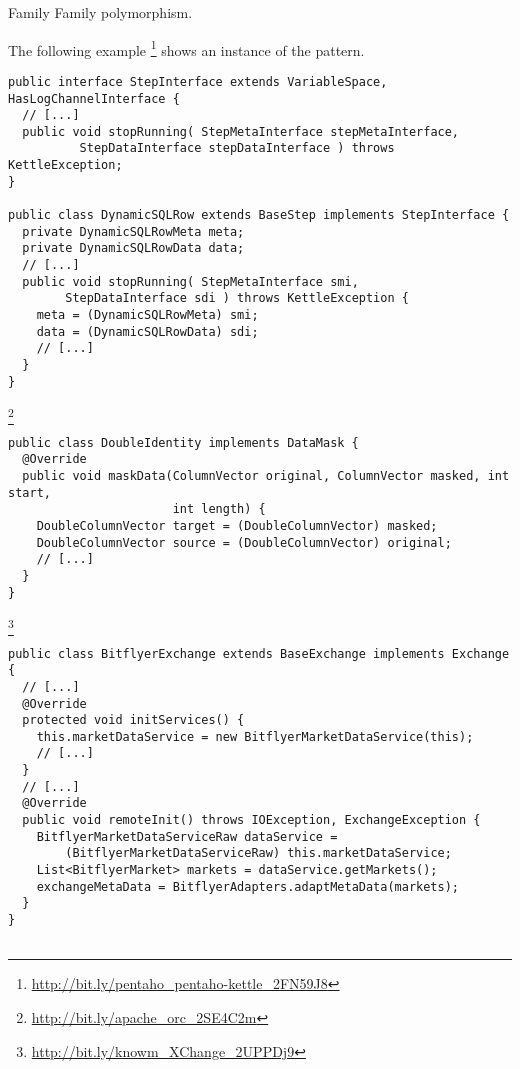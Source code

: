 \begin{pattern}{Family}
Family polymorphism.

\instances{}
The following example%
\footnote{\url{http://bit.ly/pentaho_pentaho-kettle_2FN59J8}}
%
%
shows an instance of the \thisp{} pattern.

\begin{verbatim}
public interface StepInterface extends VariableSpace, HasLogChannelInterface {
  // [...]
  public void stopRunning( StepMetaInterface stepMetaInterface,
          StepDataInterface stepDataInterface ) throws KettleException;
}

public class DynamicSQLRow extends BaseStep implements StepInterface {
  private DynamicSQLRowMeta meta;
  private DynamicSQLRowData data;
  // [...]
  public void stopRunning( StepMetaInterface smi,
        StepDataInterface sdi ) throws KettleException {
    meta = (DynamicSQLRowMeta) smi;
    data = (DynamicSQLRowData) sdi;
    // [...]
  }
}
\end{verbatim}

\footnote{\url{http://bit.ly/apache_orc_2SE4C2m}}

\begin{verbatim}
public class DoubleIdentity implements DataMask {
  @Override
  public void maskData(ColumnVector original, ColumnVector masked, int start,
                       int length) {
    DoubleColumnVector target = (DoubleColumnVector) masked;
    DoubleColumnVector source = (DoubleColumnVector) original;
    // [...]
  }
}
\end{verbatim}

\footnote{\url{http://bit.ly/knowm_XChange_2UPPDj9}}

\begin{verbatim}
public class BitflyerExchange extends BaseExchange implements Exchange {
  // [...]
  @Override
  protected void initServices() {
    this.marketDataService = new BitflyerMarketDataService(this);
    // [...]
  }
  // [...]
  @Override
  public void remoteInit() throws IOException, ExchangeException {
    BitflyerMarketDataServiceRaw dataService =
        (BitflyerMarketDataServiceRaw) this.marketDataService;
    List<BitflyerMarket> markets = dataService.getMarkets();
    exchangeMetaData = BitflyerAdapters.adaptMetaData(markets);
  }
}


\end{verbatim}
\end{pattern}
